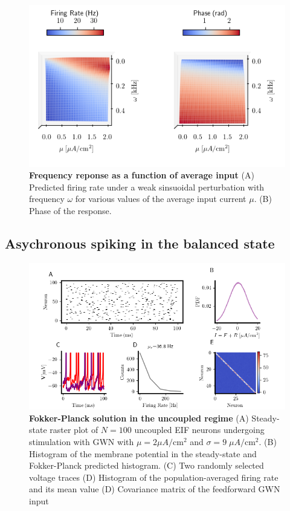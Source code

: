 \documentclass{ucetd}
\begin{document}
\begin{figure}[t!]
\centering
\includegraphics[width=125mm]{figure-4}
\caption{\textbf{Frequency reponse as a function of average input} (A) Predicted firing rate under a weak sinsuoidal perturbation with frequency $\omega$ for various values of the average input current $\mu$. (B) Phase of the response. }
\end{figure}

\subsection{Asychronous spiking in the balanced state}

\begin{figure}[t!]
\centering
\includegraphics[width=175mm]{figure-11}
\caption{\textbf{Fokker-Planck solution in the uncoupled regime} (A) Steady-state raster plot of $N=100$ uncoupled EIF neurons undergoing stimulation with GWN with $\mu = 2\mu A/\mathrm{cm}^{2}$ and $\sigma = 9 \;\mu A/\mathrm{cm}^{2}$. (B) Histogram of the membrane potential in the steady-state and Fokker-Planck predicted histogram. (C) Two randomly selected voltage traces (D) Histogram of the population-averaged firing rate and its mean value (D) Covariance matrix of the feedforward GWN input}
\end{figure}
\end{document}
